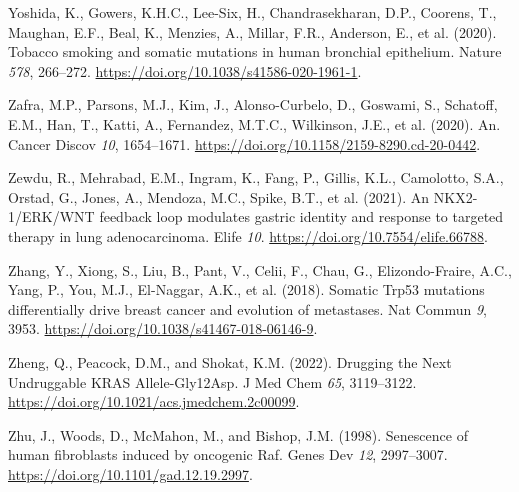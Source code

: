 \begin{CSLReferences}{0}{0}
\leavevmode{}%
Yoshida, K., Gowers, K.H.C., Lee-Six, H., Chandrasekharan, D.P., Coorens, T., Maughan, E.F., Beal, K., Menzies, A., Millar, F.R., Anderson, E., et al. (2020). Tobacco smoking and somatic mutations in human bronchial epithelium. Nature \emph{578}, 266--272. \url{https://doi.org/10.1038/s41586-020-1961-1}.

\leavevmode{}%
Zafra, M.P., Parsons, M.J., Kim, J., Alonso-Curbelo, D., Goswami, S., Schatoff, E.M., Han, T., Katti, A., Fernandez, M.T.C., Wilkinson, J.E., et al. (2020). An. Cancer Discov \emph{10}, 1654--1671. \url{https://doi.org/10.1158/2159-8290.cd-20-0442}.

\leavevmode{}%
Zewdu, R., Mehrabad, E.M., Ingram, K., Fang, P., Gillis, K.L., Camolotto, S.A., Orstad, G., Jones, A., Mendoza, M.C., Spike, B.T., et al. (2021). An NKX2-1/ERK/WNT feedback loop modulates gastric identity and response to targeted therapy in lung adenocarcinoma. Elife \emph{10}. \url{https://doi.org/10.7554/elife.66788}.

\leavevmode{}%
Zhang, Y., Xiong, S., Liu, B., Pant, V., Celii, F., Chau, G., Elizondo-Fraire, A.C., Yang, P., You, M.J., El-Naggar, A.K., et al. (2018). Somatic Trp53 mutations differentially drive breast cancer and evolution of metastases. Nat Commun \emph{9}, 3953. \url{https://doi.org/10.1038/s41467-018-06146-9}.

\leavevmode{}%
Zheng, Q., Peacock, D.M., and Shokat, K.M. (2022). Drugging the Next Undruggable KRAS Allele-Gly12Asp. J Med Chem \emph{65}, 3119--3122. \url{https://doi.org/10.1021/acs.jmedchem.2c00099}.

\leavevmode{}%
Zhu, J., Woods, D., McMahon, M., and Bishop, J.M. (1998). Senescence of human fibroblasts induced by oncogenic Raf. Genes Dev \emph{12}, 2997--3007. \url{https://doi.org/10.1101/gad.12.19.2997}.

\end{CSLReferences}
